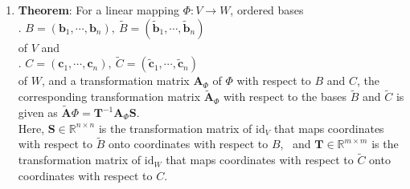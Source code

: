 \begin{enumerate}
    \item \textbf{Theorem}: For a linear mapping $\Phi : V \to W$, ordered bases
    \hfill \cite{mfml/book/mml/Deisenroth-Faisal-Ong}
    \\
    .\hfill
    $
        B = (\bm{b}_1, \cdots , \bm{b}_n), \ 
        \tilde{B} = (\tilde{\bm{b}}_1, \cdots , \tilde{\bm{b}}_n)
    $
    \hfill \cite{mfml/book/mml/Deisenroth-Faisal-Ong}
    \\
    of $V$ and
    \hfill \cite{mfml/book/mml/Deisenroth-Faisal-Ong}
    \\
    .\hfill
    $
        C = (\bm{c}_1, \cdots , \bm{c}_n), \ 
        \tilde{C} = (\tilde{\bm{c}}_1, \cdots , \tilde{\bm{c}}_n)
    $
    \hfill \cite{mfml/book/mml/Deisenroth-Faisal-Ong}
    \\
    of $W$, and a transformation matrix $\bm{A}_\Phi$ of $\Phi$ with respect to $B$ and $C$, the corresponding transformation matrix $\tilde{\bm{A}} _\Phi$ with respect to the bases $\tilde{B}$ and $\tilde{C}$ is given as
    $
        \tilde{\bm{A}} \Phi = \bm{T}^{-1}\bm{A}_\Phi \bm{S}
    $.
    \hfill \cite{mfml/book/mml/Deisenroth-Faisal-Ong}
    \\
    Here, $\bm{S} \in \mathbb{R}^{n\times n}$ is the transformation matrix of $\text{id}_V$ that maps coordinates with respect to $\tilde{B}$ onto coordinates with respect to $B$, \ 
    and $\bm{T} \in \mathbb{R}^{m\times m}$ is the transformation matrix of $\text{id}_W$ that maps coordinates with respect to $\tilde{C}$ onto coordinates with respect to $C$.
    \hfill \cite{mfml/book/mml/Deisenroth-Faisal-Ong}


\end{enumerate}

